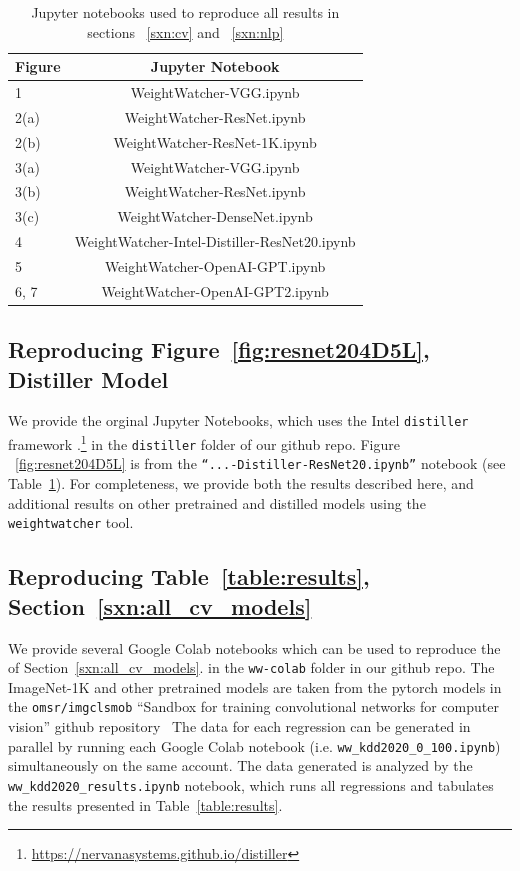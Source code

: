 \begin{table}[t]
\small
\begin{center}
\begin{tabular}{|p{1in}|c|}
\hline
Figure & Jupyter Notebook \\
\hline
1  &  WeightWatcher-VGG.ipynb \\
2(a)  &  WeightWatcher-ResNet.ipynb \\
2(b)  &  WeightWatcher-ResNet-1K.ipynb \\
3(a)  &  WeightWatcher-VGG.ipynb \\
3(b)  &  WeightWatcher-ResNet.ipynb \\
3(c)  &  WeightWatcher-DenseNet.ipynb \\
\hline
4 & WeightWatcher-Intel-Distiller-ResNet20.ipynb \\
\hline
5 & WeightWatcher-OpenAI-GPT.ipynb \\
6, 7 & WeightWatcher-OpenAI-GPT2.ipynb \\
\hline
\end{tabular}
\end{center}
\caption{Jupyter notebooks used to reproduce all results in sections ~\ref{sxn:cv} and ~\ref{sxn:nlp}}
\label{table:notebooks}
\end{table}

\subsection{Reproducing Figure~\ref{fig:resnet204D5L}, Distiller Model}

We provide the orginal Jupyter Notebooks, which uses the Intel \texttt{distiller} framework
.\footnote{\url{https://nervanasystems.github.io/distiller}} in the \texttt{distiller} folder of our 
github repo. Figure ~\ref{fig:resnet204D5L} is from the  \texttt{``...-Distiller-ResNet20.ipynb''} 
notebook (see Table~\ref{table:notebooks}).  
For completeness, we provide both the results described here, and additional results
on other pretrained and distilled models using the \texttt{weightwatcher} tool.

\subsection{Reproducing Table~\ref{table:results}, Section~\ref{sxn:all_cv_models} }

We provide several Google Colab notebooks which can be used to reproduce the of Section~\ref{sxn:all_cv_models}.
in the \texttt{ww-colab} folder in our github repo.  
The ImageNet-1K and other pretrained models are taken from the pytorch models in the \texttt{omsr/imgclsmob} 
``Sandbox for training convolutional networks for computer vision'' github repository~\cite{osmr}
The data for each regression can be generated in parallel by running each Google Colab notebook (i.e. \texttt{ww\_kdd2020\_0\_100.ipynb}) 
simultaneously on the same account.
The data generated is analyzed by the \texttt{ww\_kdd2020\_results.ipynb} notebook,
which runs all regressions and tabulates the results presented in Table~\ref{table:results}.


